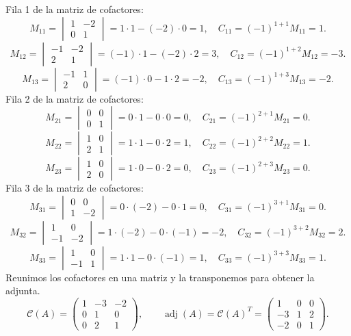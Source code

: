 \documentclass[12pt]{article}
\theoremstyle{remark}
\newcommand{\adj}{\operatorname{adj}}
\begin{document}
Fila 1 de la matriz de cofactores:
\[
M_{11}=\begin{vmatrix}1&-2\\0&1\end{vmatrix}=1\cdot 1-(-2)\cdot 0=1,\quad C_{11}=(-1)^{1+1}M_{11}=1.
\]
\[
M_{12}=\begin{vmatrix}-1&-2\\2&1\end{vmatrix}=(-1)\cdot 1-(-2)\cdot 2=3,\quad C_{12}=(-1)^{1+2}M_{12}=-3.
\]
\[
M_{13}=\begin{vmatrix}-1&1\\2&0\end{vmatrix}=(-1)\cdot 0-1\cdot 2=-2,\quad C_{13}=(-1)^{1+3}M_{13}=-2.
\]
Fila 2 de la matriz de cofactores:
\[
M_{21}=\begin{vmatrix}0&0\\0&1\end{vmatrix}=0\cdot 1-0\cdot 0=0,\quad C_{21}=(-1)^{2+1}M_{21}=0.
\]
\[
M_{22}=\begin{vmatrix}1&0\\2&1\end{vmatrix}=1\cdot 1-0\cdot 2=1,\quad C_{22}=(-1)^{2+2}M_{22}=1.
\]
\[
M_{23}=\begin{vmatrix}1&0\\2&0\end{vmatrix}=1\cdot 0-0\cdot 2=0,\quad C_{23}=(-1)^{2+3}M_{23}=0.
\]
Fila 3 de la matriz de cofactores:
\[
M_{31}=\begin{vmatrix}0&0\\1&-2\end{vmatrix}=0\cdot (-2)-0\cdot 1=0,\quad C_{31}=(-1)^{3+1}M_{31}=0.
\]
\[
M_{32}=\begin{vmatrix}1&0\\-1&-2\end{vmatrix}=1\cdot (-2)-0\cdot (-1)=-2,\quad C_{32}=(-1)^{3+2}M_{32}=2.
\]
\[
M_{33}=\begin{vmatrix}1&0\\-1&1\end{vmatrix}=1\cdot 1-0\cdot (-1)=1,\quad C_{33}=(-1)^{3+3}M_{33}=1.
\]
Reunimos los cofactores en una matriz y la transponemos para obtener la adjunta.
\[
\mathcal{C}(A)=\begin{pmatrix}1&-3&-2\\0&1&0\\0&2&1\end{pmatrix},\qquad\adj(A)=\mathcal{C}(A)^T=\begin{pmatrix}1&0&0\\-3&1&2\\-2&0&1\end{pmatrix}.
\]
\end{document}
